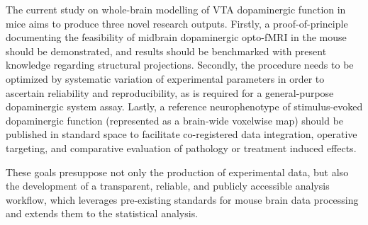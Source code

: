 The current study on whole-brain modelling of VTA dopaminergic function in mice aims to produce three novel research outputs.
Firstly, a proof-of-principle documenting the feasibility of midbrain dopaminergic opto-fMRI in the mouse should be demonstrated, and results should be benchmarked with present knowledge regarding structural projections.
Secondly, the procedure needs to be optimized by systematic variation of experimental parameters in order to ascertain reliability and reproducibility, as is required for a general-purpose dopaminergic system assay.
Lastly, a reference neurophenotype of stimulus-evoked dopaminergic function (represented as a brain-wide voxelwise map) should be published in standard space to facilitate co-registered data integration, operative targeting, and comparative evaluation of pathology or treatment induced effects.

These goals presuppose not only the production of experimental data, but also the development of a transparent, reliable, and publicly accessible analysis workflow, which leverages pre-existing standards for mouse brain data processing \cite{irsabi} and extends them to the statistical analysis.
